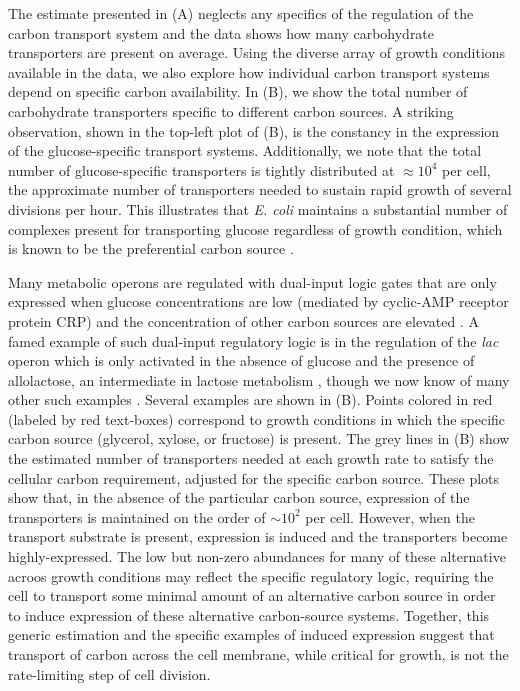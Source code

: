 The estimate presented in (A) neglects any specifics of the
regulation of the carbon transport system and the data shows how many
carbohydrate transporters are present on average. Using the diverse array of
growth conditions available in the data, we also explore how individual carbon
transport systems depend on specific carbon availability. In
(B), we show the total number of carbohydrate transporters
specific to different carbon sources. A striking observation, shown in the
top-left plot of (B), is the constancy in the expression of
the glucose-specific transport systems. Additionally, we note that the total
number of glucose-specific transporters is tightly distributed at $\approx 10^4$
per cell, the approximate number of transporters needed to sustain rapid growth
of several divisions per hour. This illustrates that \textit{E. coli} maintains
a substantial number of complexes present for transporting glucose regardless of
growth condition, which is known to be the preferential carbon source
\citep{monod1947, liu2005a, aidelberg2014}.

Many metabolic operons are regulated with dual-input logic gates that are only
expressed when glucose concentrations are low (mediated by cyclic-AMP receptor
protein CRP) and the concentration of other carbon sources are elevated
\citep{gama-castro2016, zhang2014a}. A famed example of such dual-input
regulatory logic is in the regulation of the \textit{lac} operon which is only
activated in the absence of glucose and the presence of allolactose, an
intermediate in lactose metabolism \citep{jacob1961}, though we now know of many
other such examples \citep{ireland2020, gama-castro2016, belliveau2018}.
Several examples are shown in (B). Points colored in red
(labeled by red text-boxes) correspond to growth conditions in which the
specific carbon source (glycerol, xylose, or fructose) is present. The grey
lines in (B) show the estimated number of transporters needed
at each growth rate to satisfy the cellular carbon requirement, adjusted for the
specific carbon source. These plots show that, in the absence of the particular
carbon source, expression of the transporters is maintained on the order of
$\sim 10^2$ per cell. However, when the transport substrate is present,
expression is induced and the transporters become highly-expressed. The low but
non-zero abundances for many  of these alternative acroos growth conditions may
reflect the specific regulatory logic, requiring the cell to transport some
minimal  amount of an alternative carbon source in order to induce expression
of these alternative carbon-source systems.
Together, this generic estimation and the specific examples of induced
expression suggest that transport of carbon across the cell membrane, while
critical for growth, is not the rate-limiting step of cell division.


